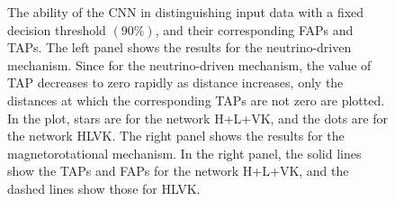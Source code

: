 \documentclass[aps,twocolumn,showpacs,groupedaddress, nofootinbib]{revtex4}  %
\begin{document}
%
%
\begin{figure}
     \begin{center}
        \quad
    \end{center}
    \caption{The ability of the \ac{CNN} in
distinguishing input data with a fixed decision threshold $(90\%)$, 
and their corresponding \acp{FAP} and \acp{TAP}. 
The left panel shows the results for the neutrino-driven mechanism.
Since for the neutrino-driven mechanism, the value of \ac{TAP} decreases to zero rapidly
as distance increases, only the distances at which the corresponding \acp{TAP} are not zero are plotted.
In the plot, stars are for the network H+L+VK, and the dots are for the network HLVK.
The right panel shows the results for the magnetorotational mechanism. 
In the right panel, the solid lines show the \acp{TAP} and \acp{FAP} 
for the network H+L+VK, and the
dashed lines show those for HLVK.\label{fig:ROCfixed}}
\end{figure}
\end{document}
